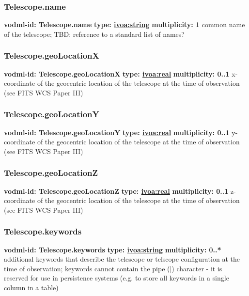     \subsubsection{Telescope.name}
      \textbf{vodml-id: Telescope.name} \newline
      \textbf{type: \hyperref[sect:ivoa]{ivoa:string}} \newline
      \textbf{multiplicity: 1} \newline
      common name of the telescope; TBD: reference to a standard list of names?

    \subsubsection{Telescope.geoLocationX}
      \textbf{vodml-id: Telescope.geoLocationX} \newline
      \textbf{type: \hyperref[sect:ivoa]{ivoa:real}} \newline
      \textbf{multiplicity: 0..1} \newline
      x-coordinate of the geocentric location of the telescope at the time of observation (see FITS WCS Paper III)

    \subsubsection{Telescope.geoLocationY}
      \textbf{vodml-id: Telescope.geoLocationY} \newline
      \textbf{type: \hyperref[sect:ivoa]{ivoa:real}} \newline
      \textbf{multiplicity: 0..1} \newline
      y-coordinate of the geocentric location of the telescope at the time of observation (see FITS WCS Paper III)

    \subsubsection{Telescope.geoLocationZ}
      \textbf{vodml-id: Telescope.geoLocationZ} \newline
      \textbf{type: \hyperref[sect:ivoa]{ivoa:real}} \newline
      \textbf{multiplicity: 0..1} \newline
      z-coordinate of the geocentric location of the telescope at the time of observation (see FITS WCS Paper III)

    \subsubsection{Telescope.keywords}
      \textbf{vodml-id: Telescope.keywords} \newline
      \textbf{type: \hyperref[sect:ivoa]{ivoa:string}} \newline
      \textbf{multiplicity: 0..*} \newline
      additional keywords that describe the telescope or telscope configuration at the time of observation; keywords cannot contain the pipe (|) character - it is reserved for use in persistence systems (e.g. to store all keywords in a single column in a table)

